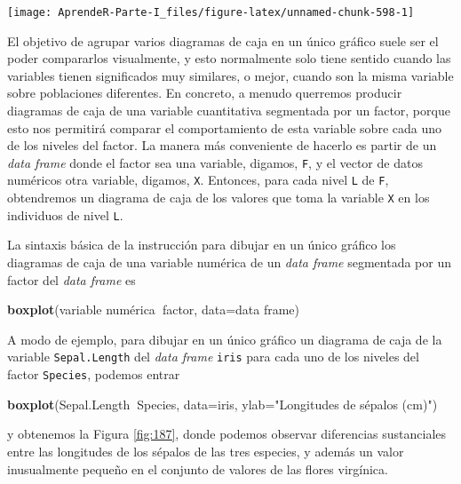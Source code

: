 \documentclass[]{book}
\newenvironment{Shaded}{\begin{snugshade}}{\end{snugshade}}
\newcommand{\DataTypeTok}[1]{\textcolor[rgb]{0.13,0.29,0.53}{#1}}
\newcommand{\KeywordTok}[1]{\textcolor[rgb]{0.13,0.29,0.53}{\textbf{#1}}}
\newcommand{\NormalTok}[1]{#1}
\newcommand{\OperatorTok}[1]{\textcolor[rgb]{0.81,0.36,0.00}{\textbf{#1}}}
\newcommand{\StringTok}[1]{\textcolor[rgb]{0.31,0.60,0.02}{#1}}
\theoremstyle{definition}
\theoremstyle{definition}
\theoremstyle{definition}
\theoremstyle{remark}
\begin{document}
\begin{center}\texttt{[image: AprendeR-Parte-I\_files/figure-latex/unnamed-chunk-598-1]} \end{center}

El objetivo de agrupar varios diagramas de caja en un único gráfico suele ser el poder compararlos visualmente, y esto normalmente solo tiene sentido cuando las variables tienen significados muy similares, o mejor, cuando son la misma variable sobre poblaciones diferentes. En concreto, a menudo querremos producir diagramas de caja de una variable cuantitativa segmentada por un factor, porque esto nos permitirá comparar el comportamiento de esta variable sobre cada uno de los niveles del factor. La manera más conveniente de hacerlo es partir de un \emph{data frame} donde el factor sea una variable, digamos, \texttt{F}, y el vector de datos numéricos otra variable, digamos, \texttt{X}. Entonces, para cada nivel \texttt{L} de \texttt{F}, obtendremos un diagrama de caja de los valores que toma la variable \texttt{X} en los individuos de nivel \texttt{L}.

La sintaxis básica de la instrucción para dibujar en un único gráfico los diagramas de caja de una variable numérica de un \emph{data frame} segmentada por un factor del \emph{data frame} es

\begin{Shaded}
\begin{Highlighting}[]
\KeywordTok{boxplot}\NormalTok{(variable numérica}\OperatorTok{~}\NormalTok{factor, }\DataTypeTok{data=}\NormalTok{data frame)}
\end{Highlighting}
\end{Shaded}

A modo de ejemplo, para dibujar en un único gráfico un diagrama de caja de la variable \texttt{Sepal.Length} del \emph{data frame} \texttt{iris} para cada uno de los niveles del factor \texttt{Species}, podemos entrar

\begin{Shaded}
\begin{Highlighting}[]
\KeywordTok{boxplot}\NormalTok{(Sepal.Length}\OperatorTok{~}\NormalTok{Species, }\DataTypeTok{data=}\NormalTok{iris, }\DataTypeTok{ylab=}\StringTok{"Longitudes de sépalos (cm)"}\NormalTok{)}
\end{Highlighting}
\end{Shaded}

y obtenemos la Figura \ref{fig:187}, donde podemos observar diferencias sustanciales entre las longitudes de los sépalos de las tres especies, y además un valor inusualmente pequeño en el conjunto de valores de las flores virgínica.
\end{document}

